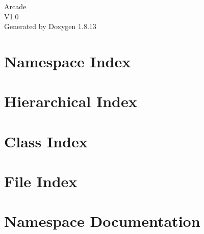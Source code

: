 \documentclass[twoside]{book}
\newcommand{\+}{\discretionary{\mbox{\scriptsize$\hookleftarrow$}}{}{}}
\newcommand{\clearemptydoublepage}{%
  \newpage{\pagestyle{empty}\cleardoublepage}%
}
\begin{document}
\hypersetup{pageanchor=false,
             bookmarksnumbered=true,
             pdfencoding=unicode
            }
\begin{titlepage}
\vspace*{7cm}
\begin{center}%
{\Large Arcade \\[1ex]\large V1.\+0 }\\
\vspace*{1cm}
{\large Generated by Doxygen 1.8.13}\\
\end{center}
\end{titlepage}
\clearemptydoublepage
{}
\tableofcontents
\clearemptydoublepage
{}
\hypersetup{pageanchor=true}

\chapter{Namespace Index}

\chapter{Hierarchical Index}

\chapter{Class Index}

\chapter{File Index}

\chapter{Namespace Documentation}

\end{document}
